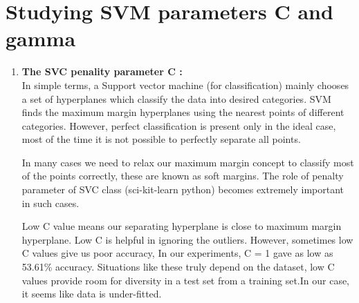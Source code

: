 \documentclass{report}
\begin{document}
\pagebreak
\section{\huge Studying SVM parameters \textbf{C} and \textbf{gamma}}
\begin{enumerate}
\item {\Large \textbf{The SVC penality parameter C :}} \\ 
\linebreak
\Large
In simple terms, a Support vector machine (for classification) mainly chooses a set of hyperplanes which classify the data into desired categories.
SVM finds the maximum margin hyperplanes using the nearest points of different categories.
However, perfect classification is present only in the ideal case, most of the time it is not possible to perfectly separate all points. 

In many cases we need to relax our maximum margin concept to classify most of the points correctly, these are known as soft margins. The role of penalty parameter of SVC class (sci-kit-learn python) becomes extremely important in such cases.

Low C value means our separating hyperplane is close to maximum margin hyperplane. Low C is helpful in ignoring the outliers. However, sometimes low C values give us poor accuracy, In our experiments, C = 1 gave as low as 53.61\% accuracy. Situations like these truly depend on the dataset, low C values provide room for diversity in a test set from a training set.In our case, it seems like data is under-fitted.


\end{enumerate}
\end{document}
